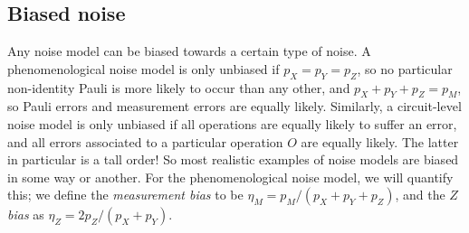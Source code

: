 
\subsection{Biased noise}

Any noise model can be biased towards a certain type of noise.
A phenomenological noise model is only unbiased if $p_X = p_Y = p_Z$, so no particular non-identity Pauli is more likely to occur than any other, and $p_X + p_Y + p_Z = p_M$, so Pauli errors and measurement errors are equally likely.
Similarly, a circuit-level noise model is only unbiased if all operations are equally likely to suffer an error, and all errors associated to a particular operation $O$ are equally likely.
The latter in particular is a tall order!
So most realistic examples of noise models are biased in some way or another.
For the phenomenological noise model, we will quantify this; we define the \textit{measurement bias} to be $\eta_M = p_M/(p_X + p_Y + p_Z)$, and the \textit{$Z$ bias} as $\eta_Z = 2p_Z/(p_X+p_Y)$.

